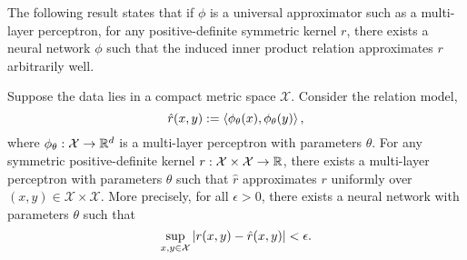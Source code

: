 
The following result states that if $\phi$ is a universal approximator such as a multi-layer perceptron, for any positive-definite symmetric kernel $r$, there exists a neural network $\phi$ such that the induced inner product relation approximates $r$ arbitrarily well.

\begin{theorem}
	\label{theorem:symmetric_inner_prod_rels_func_class}
	\hphantom{~}

	Suppose the data lies in a compact metric space \(\mathcal{X}\). Consider the relation model,
	\begin{equation*}
		\hat{r}(x, y) := \left \langle \phi_{\theta}(x), \phi_{\theta}(y) \right\rangle,
	\end{equation*}
	where $\phi_{\theta}: {\mathcal{X}} \to \mathbb{R}^d$ is a multi-layer perceptron with parameters $\theta$.
	For any symmetric positive-definite kernel $r: {\mathcal{X}} \times {\mathcal{X}} \to \mathbb{R}$, there exists a multi-layer perceptron with parameters $\theta$ such that $\hat{r}$ approximates $r$ uniformly over \((x,y) \in \mathcal{X}\times\mathcal{X}\). More precisely, for all \(\epsilon > 0\), there exists a neural network with parameters $\theta$ such that
    \[\sup_{x,y \in \mathcal{X}}{\left\lvert r(x,y) - \hat{r}(x,y)\right\rvert} < \epsilon.\]
\end{theorem}

